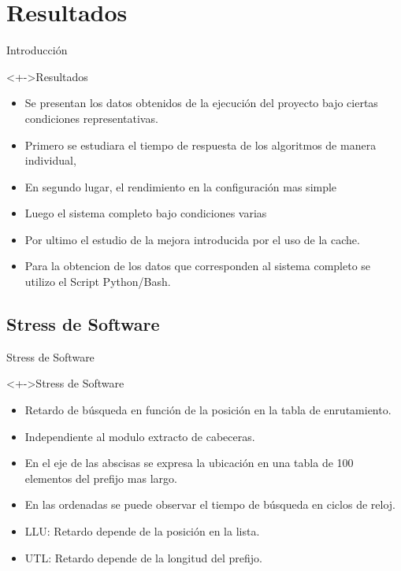 \documentclass[xcolor=dvipsnames]{beamer}
\begin{document}
\section{Resultados}
\begin{frame}{Introducción}
	\begin{block}<+->{Resultados}  
	 \begin{itemize}	
		\item Se presentan los datos obtenidos de la ejecución del proyecto bajo ciertas condiciones representativas. 
		\item Primero se estudiara el tiempo de respuesta de los algoritmos de manera individual, 
		\item En segundo lugar,  el rendimiento en la configuración mas simple
		\item Luego el sistema completo bajo condiciones varias
		\item Por ultimo el estudio de la mejora introducida por el uso de la cache. 
		\item Para la obtencion de los datos que corresponden al sistema completo se utilizo el Script Python/Bash.
	\end{itemize}
  \end{block}
\end{frame}

\subsection{Stress de Software}
\begin{frame}{Stress de Software}
\begin{block}<+->{Stress de Software}   
    \begin{itemize}
      \scriptsize
     	\item Retardo de búsqueda en función de la posición en la tabla de enrutamiento.
     	\item Independiente al modulo extracto de cabeceras.
	\item En el eje de las abscisas se expresa la ubicación en una tabla de 100 elementos del prefijo mas largo.
	\item En las ordenadas se puede observar el tiempo de búsqueda en ciclos de reloj.
	\item LLU: Retardo depende de la posición en la lista.
	\item UTL: Retardo depende de la longitud del prefijo.
    \end{itemize}
  \end{block}
\end{frame}
\end{document}
